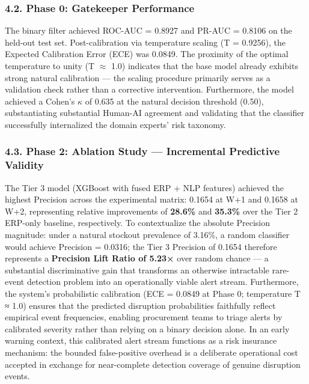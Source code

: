 \documentclass[conference]{IEEEtran}
\begin{document}
\subsubsection{4.2. Phase 0: Gatekeeper
Performance}\label{phase-0-gatekeeper-performance}

The binary filter achieved ROC-AUC = 0.8927 and PR-AUC = 0.8106 on the
held-out test set. Post-calibration via temperature scaling (T =
0.9256), the Expected Calibration Error (ECE) was 0.0849. The proximity
of the optimal temperature to unity (T \(\approx\) 1.0) indicates that
the base model already exhibits strong natural calibration --- the
scaling procedure primarily serves as a validation check rather than a
corrective intervention. Furthermore, the model achieved a Cohen's
\(\kappa\) of 0.635 at the natural decision threshold (0.50),
substantiating substantial Human-AI agreement and validating that the
classifier successfully internalized the domain experts' risk taxonomy.

\subsubsection{4.3. Phase 2: Ablation Study --- Incremental Predictive
Validity}\label{phase-2-ablation-study-incremental-predictive-validity}

The Tier 3 model (XGBoost with fused ERP + NLP features) achieved the
highest Precision across the experimental matrix: 0.1654 at W+1 and
0.1658 at W+2, representing relative improvements of \textbf{28.6\%} and
\textbf{35.3\%} over the Tier 2 ERP-only baseline, respectively. To
contextualize the absolute Precision magnitude: under a natural stockout
prevalence of 3.16\%, a random classifier would achieve Precision =
0.0316; the Tier 3 Precision of 0.1654 therefore represents a
\textbf{Precision Lift Ratio of 5.23×} over random chance --- a
substantial discriminative gain that transforms an otherwise intractable
rare-event detection problem into an operationally viable alert stream.
Furthermore, the system's probabilistic calibration (ECE = 0.0849 at
Phase 0; temperature T ≈ 1.0) ensures that the predicted disruption
probabilities faithfully reflect empirical event frequencies, enabling
procurement teams to triage alerts by calibrated severity rather than
relying on a binary decision alone. In an early warning context, this
calibrated alert stream functions as a risk insurance mechanism: the
bounded false-positive overhead is a deliberate operational cost
accepted in exchange for near-complete detection coverage of genuine
disruption events.
\end{document}
